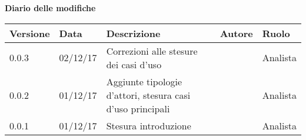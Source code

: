 \documentclass[AnalisiDeiRequisiti.tex]{subfiles}
\begin{document}
\huge \bfseries Diario delle modifiche\\
\begin{table}[htbp]
	\centering
	\renewcommand\arraystretch{1.2}

	\begin{tabularx}{\textwidth}{p{2cm}|p{2cm}|p{3cm}|p{2cm}|p{3cm}}
		\hline
		\textbf{Versione} & \textbf{Data} & \textbf{Descrizione} & \textbf{Autore} & \textbf{Ruolo}\\
		\hline
		0.0.3 & 02/12/17 & Correzioni alle stesure dei casi d'uso & \Gianluca & Analista \\
		\hline
		0.0.2 & 01/12/17 & Aggiunte tipologie d'attori, stesura casi d'uso principali & \Mirco & Analista \\
		\hline
		0.0.1 & 01/12/17 & Stesura introduzione & \Mirco & Analista
	
	\end{tabularx}

\end{table}
\end{document}

